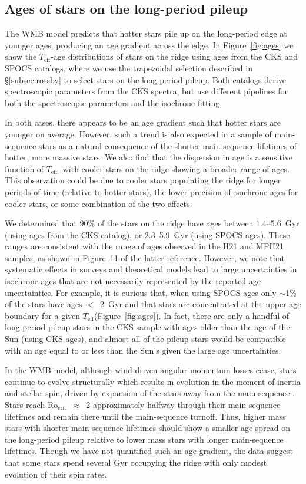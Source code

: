\documentclass[trackchanges,twocolumn]{aastex631}
\newcommand{\rocrit}{$\mathrm{Ro_{crit}}$\xspace}
\newcommand{\hall}{H21\xspace}
\newcommand{\masuda}{MPH21\xspace}
\newcommand{\teff}{\ensuremath{T_{\mathrm{eff}}}\xspace}
\begin{document}
\subsection{Ages of stars on the long-period pileup}
\label{subsec:ages}
The WMB model predicts that hotter stars pile up on the long-period edge at younger ages, producing an age gradient across the edge. In Figure~\ref{fig:ages} we show the \teff-age distributions of stars on the ridge using ages from the CKS \citep{Fulton2018} and SPOCS \citep{Brewer2018} catalogs, where we use the trapezoidal selection described in \S\ref{subsec:rossby} to select stars on the long-period pileup. Both catalogs derive spectroscopic parameters from the CKS spectra, but use different pipelines for both the spectroscopic parameters and the isochrone fitting. 

In both cases, there appears to be an age gradient such that hotter stars are younger on average. However, such a trend is also expected in a sample of main-sequence stars as a natural consequence of the shorter main-sequence lifetimes of hotter, more massive stars. We also find that the dispersion in age is a sensitive function of \teff, with cooler stars on the ridge showing a broader range of ages. This observation could be due to cooler stars populating the ridge for longer periods of time (relative to hotter stars), the lower precision of isochrone ages for cooler stars, or some combination of the two effects.

We determined that 90\% of the stars on the ridge have ages between 1.4--5.6~Gyr (using ages from the CKS catalog), or 2.3--5.9~Gyr (using SPOCS ages). These ranges are consistent with the range of ages observed in the \hall and \masuda samples, as shown in Figure~11 of the latter reference. However, we note that systematic effects in surveys and theoretical models lead to large uncertainties in isochrone ages that are not necessarily represented by the reported age uncertainties. For example, it is curious that, when using SPOCS ages only $\sim$1\% of the stars have ages $<$~2~Gyr and that stars are concentrated at the upper age boundary for a given \teff (Figure~\ref{fig:ages}). In fact, there are only a handful of long-period pileup stars in the CKS sample with ages older than the age of the Sun (using CKS ages), and almost all of the pileup stars would be compatible with an age equal to or less than the Sun's given the large age uncertainties. 

In the WMB model, although wind-driven angular momentum losses cease, stars continue to evolve structurally which results in evolution in the moment of inertia and stellar spin, driven by expansion of the stars away from the main-sequence \citep{vanSaders2019}. Stars reach \rocrit~$\approx$~2 approximately halfway through their main-sequence lifetimes and remain there until the main-sequence turnoff. Thus, higher mass stars with shorter main-sequence lifetimes should show a smaller age spread on the long-period pileup relative to lower mass stars with longer main-sequence lifetimes. Though we have not quantified such an age-gradient, the data suggest that some stars spend several Gyr occupying the ridge with only modest evolution of their spin rates.
\end{document}
